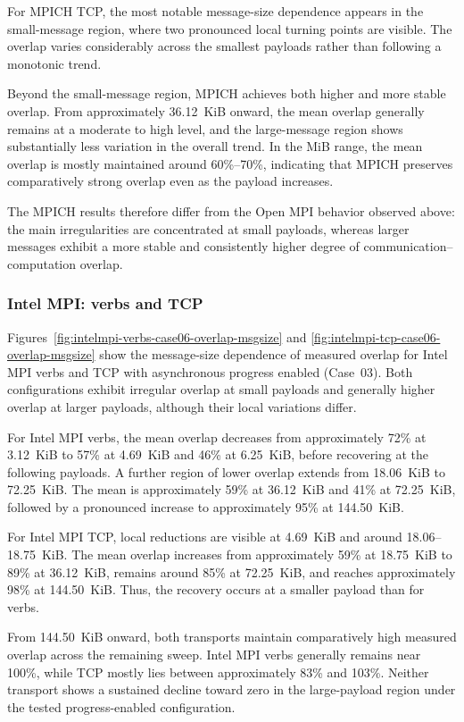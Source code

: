 For MPICH TCP, the most notable message-size dependence appears in the
small-message region, where two pronounced local turning points are visible.
The overlap varies considerably across the smallest payloads rather than
following a monotonic trend.

Beyond the small-message region, MPICH achieves both higher and more stable
overlap. From approximately 36.12~KiB onward, the mean overlap generally
remains at a moderate to high level, and the large-message region shows
substantially less variation in the overall trend. In the MiB range, the mean
overlap is mostly maintained around 60\%--70\%, indicating that MPICH
preserves comparatively strong overlap even as the payload increases.

The MPICH results therefore differ from the Open MPI behavior observed above:
the main irregularities are concentrated at small payloads, whereas larger
messages exhibit a more stable and consistently higher degree of
communication--computation overlap.




\subsubsection{Intel MPI: verbs and TCP}

Figures~\ref{fig:intelmpi-verbs-case06-overlap-msgsize} and
\ref{fig:intelmpi-tcp-case06-overlap-msgsize} show the message-size
dependence of measured overlap for Intel MPI verbs and TCP with
asynchronous progress enabled (Case~03). Both configurations exhibit
irregular overlap at small payloads and generally higher overlap at
larger payloads, although their local variations differ.

For Intel MPI verbs, the mean overlap decreases from approximately 72\%
at 3.12~KiB to 57\% at 4.69~KiB and 46\% at 6.25~KiB, before recovering
at the following payloads. A further region of lower overlap extends
from 18.06~KiB to 72.25~KiB. The mean is approximately 59\% at
36.12~KiB and 41\% at 72.25~KiB, followed by a pronounced increase to
approximately 95\% at 144.50~KiB.

For Intel MPI TCP, local reductions are visible at 4.69~KiB and around
18.06--18.75~KiB. The mean overlap increases from approximately 59\% at
18.75~KiB to 89\% at 36.12~KiB, remains around 85\% at 72.25~KiB,
and reaches approximately 98\% at 144.50~KiB. Thus, the recovery occurs
at a smaller payload than for verbs.

From 144.50~KiB onward, both transports maintain comparatively high
measured overlap across the remaining sweep. Intel MPI verbs generally
remains near 100\%, while TCP mostly lies between approximately 83\%
and 103\%. Neither transport shows a sustained decline toward zero in
the large-payload region under the tested progress-enabled configuration.

